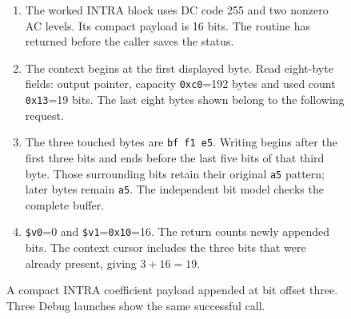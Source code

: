 \begin{figure}[htbp]
  \par\smallskip
  \begin{minipage}{\linewidth}
    \small
    \begin{enumerate}
      \item The worked INTRA block uses DC code 255 and two nonzero AC levels. Its compact payload is 16 bits. The routine has returned before the caller saves the status.
      \item The context begins at the first displayed byte. Read eight-byte fields: output pointer, capacity \texttt{0xc0}=192 bytes and used count \texttt{0x13}=19 bits. The last eight bytes shown belong to the following request.
      \item The three touched bytes are \texttt{bf f1 e5}. Writing begins after the first three bits and ends before the last five bits of that third byte. Those surrounding bits retain their original \texttt{a5} pattern; later bytes remain \texttt{a5}. The independent bit model checks the complete buffer.
      \item \texttt{\$v0}=0 and \texttt{\$v1}=\texttt{0x10}=16. The return counts newly appended bits. The context cursor includes the three bits that were already present, giving $3+16=19$.
    \end{enumerate}
  \end{minipage}
  \caption{A compact INTRA coefficient payload appended at bit offset three. Three Debug launches show the same successful call.}
  \label{fig:h263-coefficient-bits}
\end{figure}
